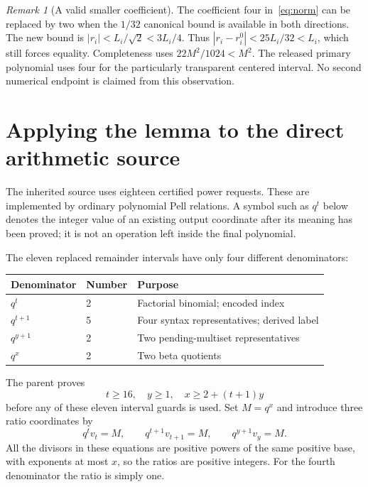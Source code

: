 \documentclass[11pt,letterpaper]{article}
\theoremstyle{remark}\newtheorem{remark}[theorem]{Remark}
\begin{document}
\begin{remark}[A valid smaller coefficient]
The coefficient four in~\eqref{eq:norm} can be replaced by two when the
$1/32$ canonical bound is available in both directions. The new bound is
$|r_i|<L_i/\sqrt2<3L_i/4$. Thus
$|r_i-r_i^0|<25L_i/32<L_i$, which still forces equality. Completeness
uses $22M^2/1024<M^2$. The released primary polynomial uses four for the
particularly transparent centered interval. No second numerical endpoint
is claimed from this observation.
\end{remark}

\section{Applying the lemma to the direct arithmetic source}

The inherited source uses eighteen certified power requests. These are
implemented by ordinary polynomial Pell relations. A symbol such as
$q^t$ below denotes the integer value of an existing output coordinate
after its meaning has been proved; it is not an operation left inside
the final polynomial.

The eleven replaced remainder intervals have only four different
denominators:
\begin{center}
\begin{tabular}{@{}lll@{}}
\toprule
Denominator & Number & Purpose\\
\midrule
$q^t$ & 2 & Factorial binomial; encoded index\\
$q^{t+1}$ & 5 & Four syntax representatives; derived label\\
$q^{y+1}$ & 2 & Two pending-multiset representatives\\
$q^x$ & 2 & Two beta quotients\\
\bottomrule
\end{tabular}
\end{center}

The parent proves
\[
 t\ge16,\quad y\ge1,\quad x\ge2+(t+1)y
\]
before any of these eleven interval guards is used. Set $M=q^x$ and
introduce three ratio coordinates by
\begin{equation}\label{eq:ratios}
 q^t v_t=M,\qquad q^{t+1}v_{t+1}=M,\qquad q^{y+1}v_y=M.
\end{equation}
All the divisors in these equations are positive powers of the same
positive base, with exponents at most $x$, so the ratios are positive
integers. For the fourth denominator the ratio is simply one.
\end{document}
